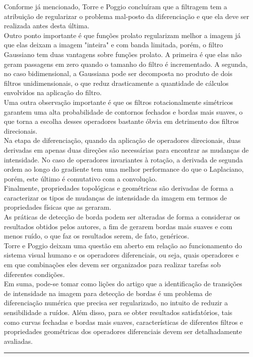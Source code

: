 \begin{enumerate}
\begin{enumerate}[label*=\arabic*.]
    Conforme já mencionado, Torre e Poggio concluíram que a filtragem tem a atribuição de regularizar o problema mal-posto da diferenciação e que ela deve ser realizada antes desta última.
    \\[6pt]
    Outro ponto importante é que funções prolato regularizam melhor a imagem já que elas deixam a imagem "inteira" e com banda limitada, porém, o filtro Gaussiano tem duas vantagens sobre funções prolato. A primeira é que elas não geram passagens em zero quando o tamanho do filtro é incrementado. A segunda, no caso bidimensional, a Gaussiana pode ser decomposta no produto de dois filtros unidimensionais, o que reduz drasticamente a quantidade de cálculos envolvidos na aplicação do filtro.
    \\[6pt]
    Uma outra observação importante é que os filtros rotacionalmente simétricos garantem uma alta probabilidade de contornos fechados e bordas mais suaves, o que torna a escolha desses operadores bastante óbvia em detrimento dos filtros direcionais.
    \\[6pt]
    Na etapa de diferenciação, quando da aplicação de operadores direcionais, duas derivadas em apenas duas direções são necessárias para encontrar as mudanças de intensidade. No caso de operadores invariantes à rotação, a derivada de segunda ordem ao longo do gradiente tem uma melhor performance do que o Laplaciano, porém, este último é comutativo com a convolução.
    \\[6pt]
    Finalmente, propriedades topológicas e geométricas são derivadas de forma a caracterizar os tipos de mudanças de intensidade da imagem em termos de propriedades físicas que as geraram.
    \\[6pt]
    As práticas de detecção de borda podem ser alteradas de forma a considerar os resultados obtidos pelos autores, a fim de gerarem bordas mais suaves e com menos ruído, o que faz os resultados serem, de fato, genéricos.
    \\[6pt]
    Torre e Poggio deixam uma questão em aberto em relação ao funcionamento do sistema visual humano e os operadores diferenciais, ou seja, quais operadores e em que combinações eles devem ser organizados para realizar tarefas sob diferentes condições.
    \\[6pt]
    Em suma, pode-se tomar como lições do artigo que a identificação de transições de intensidade na imagem para detecção de bordas é um problema de diferenciação numérica que precisa ser regularizado, no intuito de reduzir a sensibilidade a ruídos. Além disso, para se obter resultados satisfatórios, tais como curvas fechadas e bordas mais suaves, características de diferentes filtros e propriedades geométricas dos operadores diferenciais devem ser detalhadamente avaliadas.

\end{enumerate}
\end{enumerate}

\noindent\rule{14.5cm}{0.4pt}